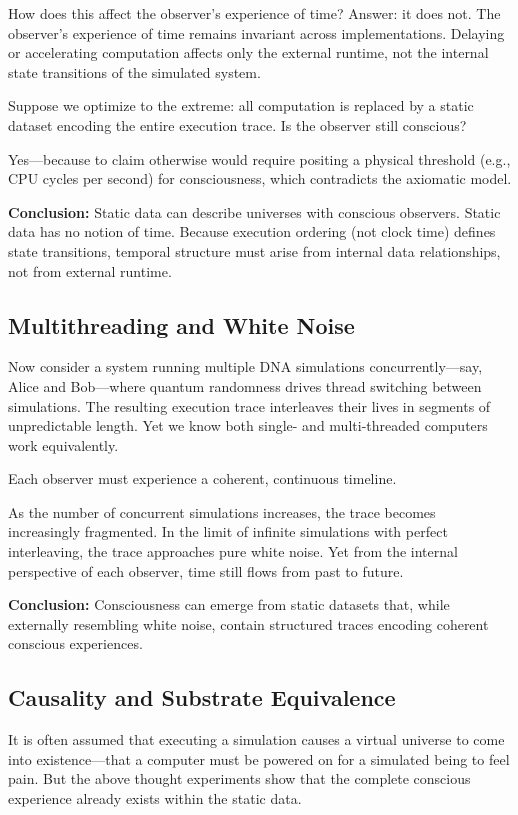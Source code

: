 \documentclass[11pt]{article}
\begin{document}
How does this affect the observer's experience of time? Answer: it does not. The observer’s experience of time remains invariant across implementations. Delaying or accelerating computation affects only the external runtime, not the internal state transitions of the simulated system.

Suppose we optimize to the extreme: all computation is replaced by a static dataset encoding the entire execution trace. Is the observer still conscious?

Yes—because to claim otherwise would require positing a physical threshold (e.g., CPU cycles per second) for consciousness, which contradicts the axiomatic model.

\textbf{Conclusion:} Static data can describe universes with conscious observers. Static data has no notion of time. Because execution ordering (not clock time) defines state transitions, temporal structure must arise from internal data relationships, not from external runtime.

\subsection{Multithreading and White Noise}

Now consider a system running multiple DNA simulations concurrently—say, Alice and Bob—where quantum randomness drives thread switching between simulations. The resulting execution trace interleaves their lives in segments of unpredictable length. Yet we know both single- and multi-threaded computers work equivalently.

Each observer must experience a coherent, continuous timeline.

As the number of concurrent simulations increases, the trace becomes increasingly fragmented. In the limit of infinite simulations with perfect interleaving, the trace approaches pure white noise. Yet from the internal perspective of each observer, time still flows from past to future.

\textbf{Conclusion:} Consciousness can emerge from static datasets that, while externally resembling white noise, contain structured traces encoding coherent conscious experiences.

\subsection{Causality and Substrate Equivalence}

It is often assumed that executing a simulation causes a virtual universe to come into existence—that a computer must be powered on for a simulated being to feel pain. But the above thought experiments show that the complete conscious experience already exists within the static data.
\end{document}
